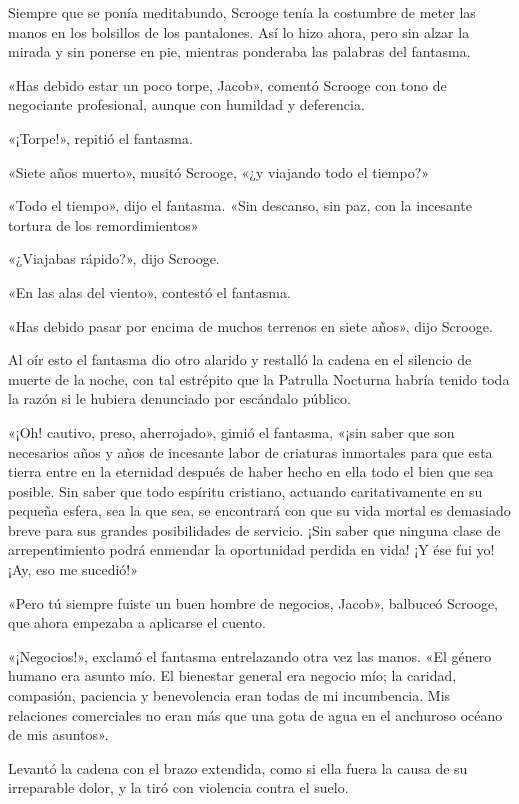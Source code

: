 \documentclass{novela}
\begin{document}
 Siempre que se ponía meditabundo, Scrooge tenía la costumbre de meter las manos en los bolsillos de los pantalones. Así lo hizo ahora, pero sin alzar la mirada y sin ponerse en pie, mientras ponderaba las palabras del fantasma.

 «Has debido estar un poco torpe, Jacob», comentó Scrooge con tono de negociante profesional, aunque con humildad y deferencia.

 «¡Torpe!», repitió el fantasma.

 «Siete años muerto», musitó Scrooge, «¿y viajando todo el tiempo?»

 «Todo el tiempo», dijo el fantasma. «Sin descanso, sin paz, con la incesante tortura de los remordimientos»

 «¿Viajabas rápido?», dijo Scrooge.

 «En las alas del viento», contestó el fantasma.

 «Has debido pasar por encima de muchos terrenos en siete años», dijo Scrooge.

 Al oír esto el fantasma dio otro alarido y restalló la cadena en el silencio de muerte de la noche, con tal estrépito que la Patrulla Nocturna habría tenido toda la razón si le hubiera denunciado por escándalo público.

 «¡Oh! cautivo, preso, aherrojado», gimió el fantasma, «¡sin saber que son necesarios años y años de incesante labor de criaturas inmortales para que esta tierra entre en la eternidad después de haber hecho en ella todo el bien que sea posible. Sin saber que todo espíritu cristiano, actuando caritativamente en su pequeña esfera, sea la que sea, se encontrará con que su vida mortal es demasiado breve para sus grandes posibilidades de servicio. ¡Sin saber que ninguna clase de arrepentimiento podrá enmendar la oportunidad perdida en vida! ¡Y ése fui yo! ¡Ay, eso me sucedió!»

 «Pero tú siempre fuiste un buen hombre de negocios, Jacob», balbuceó Scrooge, que ahora empezaba a aplicarse el cuento.

 «¡Negocios!», exclamó el fantasma entrelazando otra vez las manos. «El género humano era asunto mío. El bienestar general era negocio mío; la caridad, compasión, paciencia y benevolencia eran todas de mi incumbencia. Mis relaciones comerciales no eran más que una gota de agua en el anchuroso océano de mis asuntos».

 Levantó la cadena con el brazo extendida, como si ella fuera la causa de su irreparable dolor, y la tiró con violencia contra el suelo.
\end{document}
